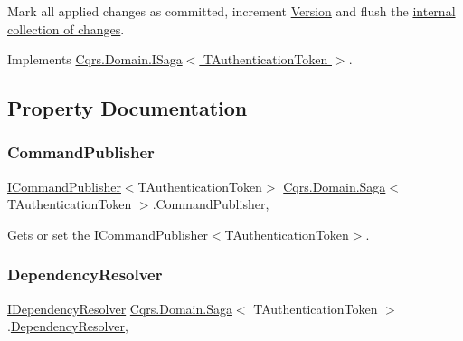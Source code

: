 Mark all applied changes as committed, increment \hyperlink{classCqrs_1_1Domain_1_1Saga_a581e88da4e3e76d3704586f97866a7a6_a581e88da4e3e76d3704586f97866a7a6}{Version} and flush the \hyperlink{}{internal collection of changes}. 



Implements \hyperlink{interfaceCqrs_1_1Domain_1_1ISaga_a85c75f80bc5be4bad7f1d9f1231bfba7_a85c75f80bc5be4bad7f1d9f1231bfba7}{Cqrs.\+Domain.\+I\+Saga$<$ T\+Authentication\+Token $>$}.



\subsection{Property Documentation}
\mbox{\label{classCqrs_1_1Domain_1_1Saga_a944fc264b716dcd60a2e51c9897766fa_a944fc264b716dcd60a2e51c9897766fa}} 
\subsubsection{\texorpdfstring{Command\+Publisher}{CommandPublisher}}
{\footnotesize\ttfamily \hyperlink{interfaceCqrs_1_1Commands_1_1ICommandPublisher}{I\+Command\+Publisher}$<$T\+Authentication\+Token$>$ \hyperlink{classCqrs_1_1Domain_1_1Saga}{Cqrs.\+Domain.\+Saga}$<$ T\+Authentication\+Token $>$.Command\+Publisher\hspace{0.3cm}{\ttfamily [get]}, {\ttfamily [protected]}}



Gets or set the I\+Command\+Publisher$<$\+T\+Authentication\+Token$>$. 

\mbox{\label{classCqrs_1_1Domain_1_1Saga_afd8b9bae392272e1651f2ea53c65db12_afd8b9bae392272e1651f2ea53c65db12}} 
\subsubsection{\texorpdfstring{Dependency\+Resolver}{DependencyResolver}}
{\footnotesize\ttfamily \hyperlink{interfaceCqrs_1_1Configuration_1_1IDependencyResolver}{I\+Dependency\+Resolver} \hyperlink{classCqrs_1_1Domain_1_1Saga}{Cqrs.\+Domain.\+Saga}$<$ T\+Authentication\+Token $>$.\hyperlink{classCqrs_1_1Configuration_1_1DependencyResolver}{Dependency\+Resolver}\hspace{0.3cm}{\ttfamily [get]}, {\ttfamily [protected]}}



